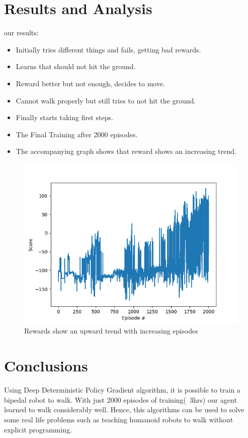 \documentclass[a4paper]{article}
\begin{document}
\section* {Results and Analysis}

our results:
\begin{itemize}
\item Initially tries different things and fails, getting bad rewards.
\item Learns that should not hit the ground.
\item Reward better but not enough, decides to move.
\item Cannot walk properly but still tries to not hit the ground.
\item Finally starts taking first steps.
\item The Final Training after 2000 episodes.
\item The accompanying graph shows that reward shows an increasing trend.
\end{itemize}

\begin{figure}
\centering
\includegraphics[scale=0.98]{Pictures/graph.png}
\caption{Rewards show an upward trend with increasing episodes}
\label{Frog}
\end{figure}


\section*{Conclusions}
Using Deep Deterministic Policy Gradient algorithm, it is possible to train a bipedal robot to walk. With just 2000 episodes of training(~3hrs) our agent learned to walk considerably well. Hence, this algorithms can be used to solve some real life problems such as teaching humanoid robots to walk without explicit programming.
\end{document}
